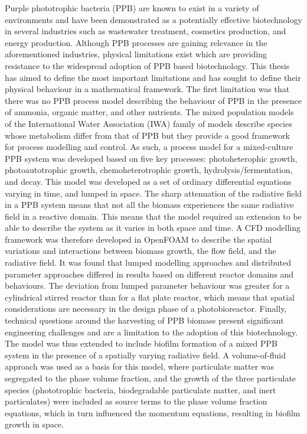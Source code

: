 %
%
%
%
%

Purple phototrophic bacteria (PPB) are known to exist in a variety of environments and have been demonstrated as a potentially effective biotechnology in several industries such as wastewater treatment, cosmetics production, and energy production. Although PPB processes are gaining relevance in the aforementioned industries, physical limitations exist which are providing resistance to the widespread adoption of PPB based biotechnology. This thesis has aimed to define the most important limitations and has sought to define their physical behaviour in a mathematical framework. The first limitation was that there was no PPB process model describing the behaviour of PPB in the presence of ammonia, organic matter, and other nutrients. The mixed population models of the International Water Association (IWA) family of models describe species whose metabolism differ from that of PPB but they provide a good framework for process modelling and control. As such, a process model for a mixed-culture PPB system was developed based on five key processes: photoheterophic growth, photoautotrophic growth, chemoheterotrophic growth, hydrolysis/fermentation, and decay. This model was developed as a set of ordinary differential equations varying in time, and lumped in space. The sharp attenuation of the radiative field in a PPB system means that not all the biomass experiences the same radiative field in a reactive domain. This means that the model required an extension to be able to describe the system as it varies in both space and time. A CFD modelling framework was therefore developed in OpenFOAM to describe the spatial variations and interactions between biomass growth, the flow field, and the radiative field. It was found that lumped modelling approaches and distributed parameter approaches differed in results based on different reactor domains and behaviours. The deviation from lumped parameter behaviour was greater for a cylindrical stirred reactor than for a flat plate reactor, which means that spatial considerations are necessary in the design phase of a photobioreactor. Finally, technical questions around the harvesting of PPB biomass present significant engineering challenges and are a limitation to the adoption of this biotechnology. The model was thus extended to include biofilm formation of a mixed PPB system in the presence of a spatially varying radiative field. A volume-of-fluid approach was used as a basis for this model, where particulate matter was segregated to the phase volume fraction, and the growth of the three particulate species (phototrophic bacteria, biodegradable particulate matter, and inert particulates) were included as source terms to the phase volume fraction equations, which in turn influenced the momentum equations, resulting in biofilm growth in space.

